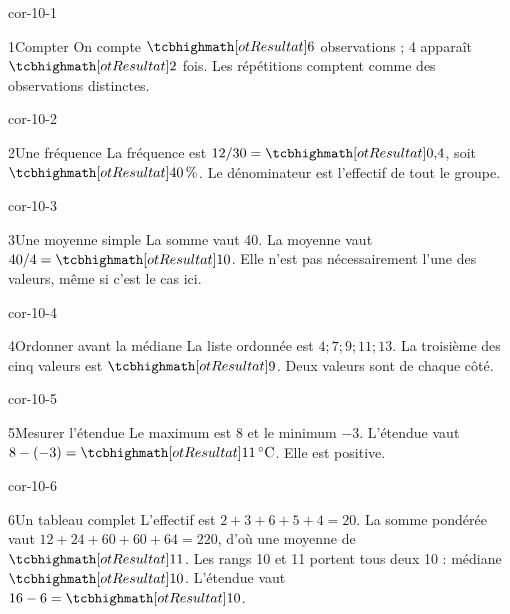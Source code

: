 \clearpage\pagestyle{otMain}\fontsize{11}{15}\selectfont{}
\begin{blocLivre}{cor-10-1}\begin{corrige}{1}{Compter}
On compte $\res6$ observations ; 4 apparaît $\res2$ fois. Les répétitions comptent comme des observations distinctes.
\end{corrige}\end{blocLivre}
\begin{blocLivre}{cor-10-2}\begin{corrige}{2}{Une fréquence}
La fréquence est $12/30=\res{0{,}4}$, soit $\res{40\,\%}$. Le dénominateur est l’effectif de tout le groupe.
\end{corrige}\end{blocLivre}
\begin{blocLivre}{cor-10-3}\begin{corrige}{3}{Une moyenne simple}
La somme vaut 40. La moyenne vaut $40/4=\res{10}$. Elle n’est pas nécessairement l’une des valeurs, même si c’est le cas ici.
\end{corrige}\end{blocLivre}
\begin{blocLivre}{cor-10-4}\begin{corrige}{4}{Ordonner avant la médiane}
La liste ordonnée est $4;7;9;11;13$. La troisième des cinq valeurs est $\res9$. Deux valeurs sont de chaque côté.
\end{corrige}\end{blocLivre}
\begin{blocLivre}{cor-10-5}\begin{corrige}{5}{Mesurer l’étendue}
Le maximum est 8 et le minimum $-3$. L’étendue vaut $8-(-3)=\res{11\,^\circ\mathrm C}$. Elle est positive.
\end{corrige}\end{blocLivre}
\begin{blocLivre}{cor-10-6}\begin{corrige}{6}{Un tableau complet}
L’effectif est $2+3+6+5+4=20$. La somme pondérée vaut $12+24+60+60+64=220$, d’où une moyenne de $\res{11}$. Les rangs 10 et 11 portent tous deux 10 : médiane $\res{10}$. L’étendue vaut $16-6=\res{10}$.
\end{corrige}\end{blocLivre}
